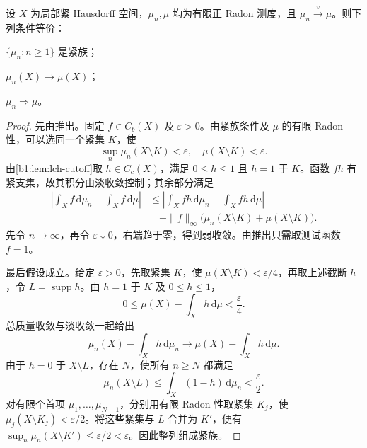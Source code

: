 \begin{theorem}\label{b1:thm:vague-tight-weak}
设 \(X\) 为局部紧 Hausdorff 空间，\(\mu_n,\mu\) 均为有限正 Radon 测度，且 \(\mu_n\xrightarrow{v}\mu\)。则下列条件等价：
\begin{equivalences}
\item\label{b1:item:vague-tight-family}\(\{\mu_n:n\geq1\}\) 是紧族；
\item\label{b1:item:vague-total-mass}\(\mu_n(X)\rightarrow\mu(X)\)；
\item\label{b1:item:vague-to-weak}\(\mu_n\Rightarrow\mu\)。
\end{equivalences}
\end{theorem}
\begin{proof}
先由推出。固定 \(f\in C_b(X)\) 及 \(\varepsilon>0\)。由紧族条件及 \(\mu\) 的有限 Radon 性，可以选同一个紧集 \(K\)，使
\[
 \sup_n\mu_n(X\setminus K)<\varepsilon,
 \quad \mu(X\setminus K)<\varepsilon.
\]
由\cref{b1:lem:lch-cutoff}取 \(h\in C_c(X)\)，满足 \(0\leq h\leq1\) 且 \(h=1\) 于 \(K\)。函数 \(fh\) 有紧支集，故其积分由淡收敛控制；其余部分满足
\begin{align*}
 \left|\int_X f\,\mathrm d\mu_n-\int_X f\,\mathrm d\mu\right|
 &\leq\left|\int_X fh\,\mathrm d\mu_n-\int_X fh\,\mathrm d\mu\right|\\
 &\quad+\|f\|_\infty\bigl(\mu_n(X\setminus K)+\mu(X\setminus K)\bigr).
\end{align*}
先令 \(n\rightarrow\infty\)，再令 \(\varepsilon\downarrow0\)，右端趋于零，得到弱收敛。由推出只需取测试函数 \(f=1\)。

最后假设成立。给定 \(\varepsilon>0\)，先取紧集 \(K\)，使 \(\mu(X\setminus K)<\varepsilon/4\)，再取上述截断 \(h\)，令 \(L=\operatorname{supp}h\)。由 \(h=1\) 于 \(K\) 及 \(0\leq h\leq1\)，
\[
 0\leq\mu(X)-\int_Xh\,\mathrm d\mu<\frac{\varepsilon}{4}.
\]
总质量收敛与淡收敛一起给出
\[
 \mu_n(X)-\int_Xh\,\mathrm d\mu_n
 \longrightarrow\mu(X)-\int_Xh\,\mathrm d\mu.
\]
由于 \(h=0\) 于 \(X\setminus L\)，存在 \(N\)，使所有 \(n\geq N\) 都满足
\[
 \mu_n(X\setminus L)
 \leq\int_X(1-h)\,\mathrm d\mu_n<\frac{\varepsilon}{2}.
\]
对有限个首项 \(\mu_1,\ldots,\mu_{N-1}\)，分别用有限 Radon 性取紧集 \(K_j\)，使 \(\mu_j(X\setminus K_j)<\varepsilon/2\)。将这些紧集与 \(L\) 合并为 \(K'\)，便有 \(\sup_n\mu_n(X\setminus K')\leq\varepsilon/2<\varepsilon\)。因此整列组成紧族。
\end{proof}

